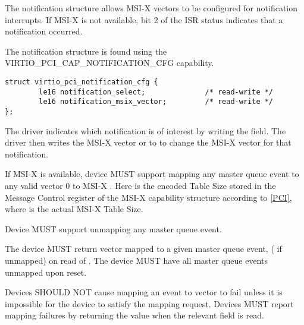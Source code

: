The notification structure allows MSI-X vectors to be configured for
notification interrupts.  If MSI-X is not available, bit 2 of the ISR status
indicates that a notification occurred.

The notification structure is found using the VIRTIO_PCI_CAP_NOTIFICATION_CFG
capability.

\begin{lstlisting}
struct virtio_pci_notification_cfg {
        le16 notification_select;              /* read-write */
        le16 notification_msix_vector;         /* read-write */
};
\end{lstlisting}

The driver indicates which notification is of interest by writing the
 field.  The driver then writes the MSI-X vector or
 to  to change the
MSI-X vector for that notification.


If MSI-X is available, device MUST support mapping any master queue
event to any valid vector 0 to MSI-X . Here
 is the  encoded Table Size stored in the
Message Control register of the MSI-X capability structure according to
\hyperref[intro:PCI]{[PCI]}, where  is the actual MSI-X Table
Size.

Device MUST support unmapping any master queue event.

The device MUST return vector mapped to a given master queue event,
( if unmapped) on read of
. The device MUST have all master queue
events unmapped upon reset.

Devices SHOULD NOT cause mapping an event to vector to fail unless it is
impossible for the device to satisfy the mapping request. Devices MUST
report mapping failures by returning the  value when
the relevant  field is read.


